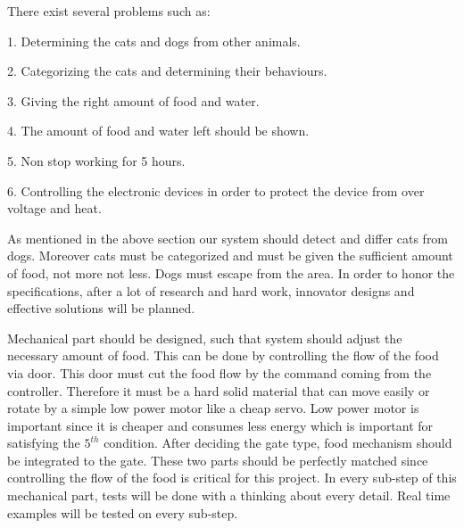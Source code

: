 
There exist several problems such as:

1. Determining the cats and dogs from other animals.

2. Categorizing the cats and determining their behaviours. 

3. Giving the right amount of food and water.

4. The amount of food and water left should be shown.

5. Non stop working for 5 hours.

6. Controlling the electronic devices in order to protect the device from over voltage and heat. 

As mentioned in the above section our system should detect and differ cats from dogs. Moreover cats must be categorized and must be given the sufficient amount of food, not more not less. Dogs must escape from the area. In order to honor the specifications, after a lot of research and hard work, innovator designs and effective solutions will be planned.

Mechanical part should be designed, such that system should adjust the necessary amount of food. This can be done by controlling the flow of the food via door. This door must cut the food flow by the command coming from the controller. Therefore it must be a hard solid material that can move easily or rotate by a simple low power motor like a cheap servo\cite{cite:cheapservo}. Low power motor is important since it is cheaper and consumes less energy which is important for satisfying the \(5^{th}\) condition. After deciding the gate type, food mechanism should be integrated to the gate. These two parts should be perfectly matched since controlling the flow of the food is critical for this project. In every sub-step of this mechanical part, tests will be done with a thinking about every detail. Real time examples will be tested on every sub-step.  

